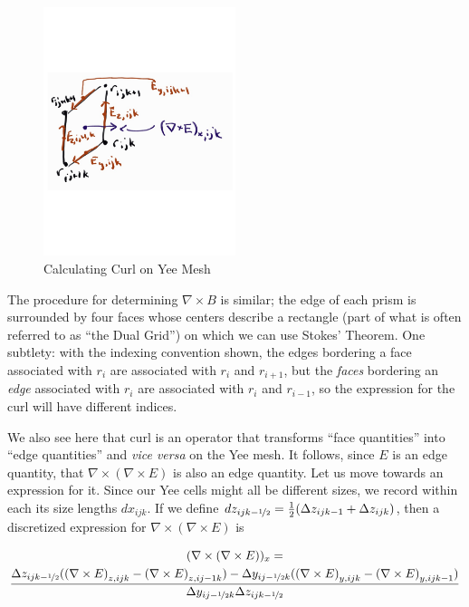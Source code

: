 \documentclass{article}
\newcommand{\Fijk}[5]{{#1}_{{#2},{#3}{#4}{#5}}}
\newcommand{\curl}[1]{\nabla \times {#1}}
\newcommand{\dy}{\Delta y}
\newcommand{\dz}{\Delta z}
\newcommand{\delxe}{(\curl{E})}
\begin{document}
\begin{figure}[htbp]
  \centering
  \includegraphics[width=0.5\textwidth]{CurlDiagram.pdf}
  \caption{Calculating Curl on Yee Mesh}
  \label{fig:yeecurl}
\end{figure}

The procedure for determining $\curl{B}$ is similar; the edge of
each prism is surrounded by four faces whose centers describe a
rectangle (part of what is often referred to as ``the Dual Grid'') on
which we can use Stokes' Theorem.  One subtlety: with the indexing
convention shown, the edges bordering a face associated with $r_i$ are associated with $r_i$ and
$r_{i+1}$, but the {\em faces} bordering an {\em edge} associated with
$r_i$ are associated with $r_i$ and $r_{i-1}$, so the expression for
the curl will have different indices.

We  also see here that curl is an
operator that transforms ``face quantities'' into ``edge quantities''
and {\it vice versa} on the Yee mesh.  It follows, since $E$ is an
edge quantity, that $\curl{(\curl{E})}$ is also an edge quantity.  Let
us move towards an expression for it.  Since our Yee cells might all
be different sizes, we record within each its size lengths $dx_{ijk}$.  If we define
$dz_{ijk-\nicefrac{1}{2}} = \frac{1}{2} (\dz_{ijk-1} + \dz_{ijk})$,
then a discretized expression for $\curl{\delxe}$ is

\begin{multline}
  (\curl{ \delxe })_x = \\ \frac{\dz_{ijk-\nicefrac{1}{2}}
    (\Fijk{\delxe}{z}{i}{j}{k} - \Fijk{\delxe}{z}{i}{j-1}{k}) -
    \dy_{ij-\nicefrac{1}{2}k} (\Fijk{\delxe}{y}{i}{j}{k} -
    \Fijk{\delxe}{y}{i}{j}{k-1}) }{\dy_{ij-\nicefrac{1}{2}k} \dz_{ijk-\nicefrac{1}{2}} }\label{eq:1}
\end{multline}



\end{document}
